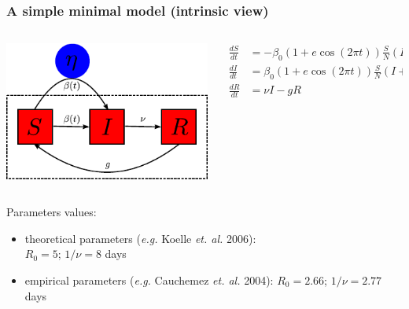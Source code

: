 \documentclass{beamer}
\begin{document}
\begin{frame}
  \frametitle{A simple minimal model (intrinsic view)}
  \begin{columns}
    \begin{column}{0.5 \linewidth}
      \begin{center}
        \includegraphics[width=0.7 \linewidth]{graph/sirs.pdf}
      \end{center}
    \end{column}
  \begin{column}{0.5 \linewidth}
  \begin{align*}
    \frac{dS}{dt} &=-\beta_0(1+e \cos(2 \pi t)) \frac{S}{N} (I+\eta) +g R \\
    \frac{dI}{dt} &= \beta_0(1+e \cos(2 \pi t))  \frac{S}{N} (I+\eta) -\nu I \\
    \frac{dR}{dt} &= \nu I -g R
  \end{align*}
  \end{column}
  \end{columns}
\pause

\vspace*{0.5 cm}
Parameters values:
  \begin{itemize}
  \item theoretical parameters (\textit{e.g.} Koelle \textit{et. al.} 2006):\\ $R_0=5$; $1/\nu=8$ days
  \item empirical parameters (\textit{e.g.} Cauchemez \textit{et. al.} 2004): $R_0=2.66$; $1/\nu=2.77$ days
  \end{itemize}
\end{frame}
\end{document}
